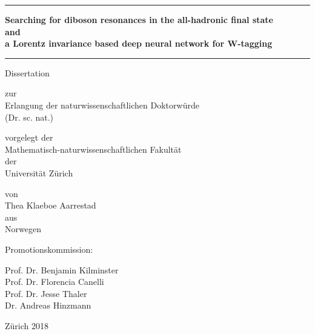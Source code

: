 \begin{center}

  \thispagestyle{empty}
  {\parindent0cm
   \rule{\linewidth}{.3ex}}
  \begin{center}

    \bfseries\LARGE
    Searching for diboson resonances in the all-hadronic final state\\
    and\\
    a Lorentz invariance based deep neural network for W-tagging 
  \end{center}
  \rule{\linewidth}{.3ex}

\par
\vspace{0.6 in}

{\LARGE Dissertation}
\vspace{0.1in}

zur \\
Erlangung der 
naturwissenschaftlichen Doktorw\"urde \\
(Dr. sc. nat.) \\
\par
\vspace{0.6in}


vorgelegt der\\
Mathematisch-naturwissenschaftlichen Fakult\"at \\
der \\
\vspace{0.05in}
{\LARGE Universit\"at Z\"urich}
\par
\vspace{0.3in}


\vspace{0.3in}
von \\
\vspace{0.05in}
{\LARGE Thea Klaeboe Aarrestad} \\
aus \\
Norwegen \\
\par
\vspace{0.6in}


Promotionskommission:\\
\par
\vspace{0.1in}


Prof. Dr. Benjamin Kilminster\\
Prof. Dr. Florencia Canelli\\
Prof. Dr. Jesse Thaler\\
Dr. Andreas Hinzmann\\

\par
\vspace{0.6in}


Z\"urich 2018

\end{center}
